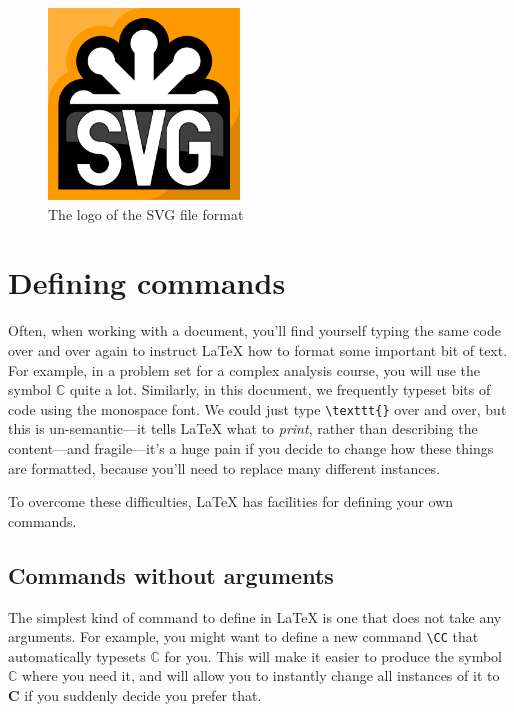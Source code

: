 \documentclass{article}
\newcommand*{\code}[1]{\texttt{#1}}
\begin{document}
\begin{figure}[htb]
  \centering
  \includegraphics[width=2in]{logo}
  \caption{The logo of the SVG file format}
  \label{fig:svg}
\end{figure}

\section{Defining commands}
Often, when working with a document, you'll find yourself typing the same code over and over again to instruct \LaTeX{} how to format some important bit of text.
For example, in a problem set for a complex analysis course, you will use the symbol $\mathbb{C}$ quite a lot.
Similarly, in this document, we frequently typeset bits of code using the monospace font.
We could just type \code{\textbackslash{}texttt\{\}} over and over, but this is un-semantic---it tells \LaTeX{} what to \emph{print}, rather than describing the content---and fragile---it's a huge pain if you decide to change how these things are formatted, because you'll need to replace many different instances.

To overcome these difficulties, \LaTeX{} has facilities for defining your own commands.

\subsection{Commands without arguments}
The simplest kind of command to define in \LaTeX{} is one that does not take any arguments.
For example, you might want to define a new command \code{\textbackslash{}CC} that automatically typesets $\mathbb{C}$ for you.
This will make it easier to produce the symbol $\mathbb{C}$ where you need it, and will allow you to instantly change all instances of it to $\mathbf{C}$ if you suddenly decide you prefer that.
\end{document}
